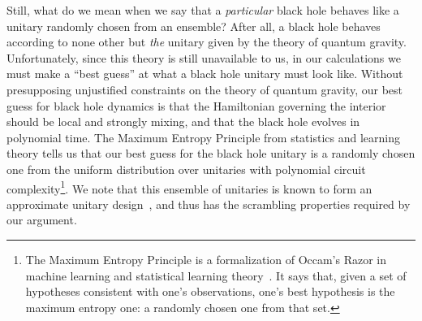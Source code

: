 \documentclass[a4paper,11pt]{article}
\theoremstyle{definition}
\begin{document}
Still, what do we mean when we say that a \emph{particular} black hole behaves like a unitary randomly chosen from an ensemble? After all, a black hole behaves according to none other but \emph{the} unitary given by the theory of quantum gravity. Unfortunately, since this theory is still unavailable to us, in our calculations we must make a ``best guess'' at what a black hole unitary must look like. Without presupposing unjustified constraints on the theory of quantum gravity, our best guess for black hole dynamics is that the Hamiltonian governing the interior should be local and strongly mixing, and that the black hole evolves in polynomial time. The Maximum Entropy Principle from statistics and learning theory tells us that our best guess for the black hole unitary is a randomly chosen one from the uniform distribution over unitaries with polynomial circuit complexity\footnote{The Maximum Entropy Principle is a formalization of Occam's Razor in machine learning and statistical learning theory~\cite{shore1980axiomatic}. It says that, given a set of hypotheses consistent with one's observations, one's best hypothesis is the maximum entropy one: a randomly chosen one from that set.}. We note that this ensemble of unitaries is known to form an approximate unitary design~\cite{brandao2012local}, and thus has the scrambling properties required by our argument.
\end{document}
